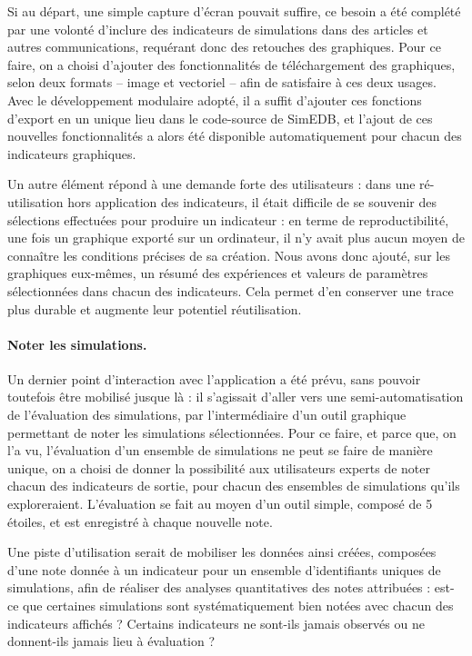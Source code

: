 Si au départ, une simple capture d'écran pouvait suffire, ce besoin a été complété par une volonté d'inclure des indicateurs de simulations dans des articles et autres communications, requérant donc des retouches des graphiques.
Pour ce faire, on a choisi d'ajouter des fonctionnalités de téléchargement des graphiques, selon deux formats -- image et vectoriel -- afin de satisfaire à ces deux usages.
Avec le développement modulaire adopté, il a suffit d'ajouter ces fonctions d'export en un unique lieu dans le code-source de SimEDB, et l'ajout de ces nouvelles fonctionnalités a alors été disponible automatiquement pour chacun des indicateurs graphiques.

Un autre élément répond à une demande forte des utilisateurs : dans une ré-utilisation hors application des indicateurs, il était difficile de se souvenir des sélections effectuées pour produire un indicateur : en terme de reproductibilité, une fois un graphique exporté sur un ordinateur, il n'y avait plus aucun moyen de connaître les conditions précises de sa création.
Nous avons donc ajouté, sur les graphiques eux-mêmes, un résumé des expériences et valeurs de paramètres sélectionnées dans chacun des indicateurs.
Cela permet d'en conserver une trace plus durable et augmente leur potentiel réutilisation.

\paragraph{Noter les simulations.}

Un dernier point d'interaction avec l'application a été prévu, sans pouvoir toutefois être mobilisé jusque là : il s'agissait d'aller vers une semi-automatisation de l'évaluation des simulations, par l'intermédiaire d'un outil graphique permettant de \og noter\fg{} les simulations sélectionnées.
Pour ce faire, et parce que, on l'a vu, l'évaluation d'un ensemble de simulations ne peut se faire de manière unique, on a choisi de donner la possibilité aux utilisateurs experts de noter chacun des indicateurs de sortie, pour chacun des ensembles de simulations qu'ils exploreraient.
L'évaluation se fait au moyen d'un outil simple, composé de 5 \og étoiles\fg{}, et est enregistré à chaque nouvelle note.

Une piste d'utilisation serait de mobiliser les données ainsi créées, composées d'une note donnée à un indicateur pour un ensemble d'identifiants uniques de simulations, afin de réaliser des analyses quantitatives des notes attribuées : est-ce que certaines simulations sont systématiquement bien notées avec chacun des indicateurs affichés ? Certains indicateurs ne sont-ils jamais observés ou ne donnent-ils jamais lieu à évaluation ?

